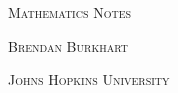 \documentclass[11pt]{report}
\begin{document}
\begin{titlepage}
    \centering
    \vspace*{2cm}
	{\scshape\LARGE Mathematics Notes \par}
    \vspace{1cm}
    \vfill
    \vfill
    \vfill
    \vfill

    {\scshape\large Brendan Burkhart \par}
    \vspace{0.5cm}
    {\scshape Johns Hopkins University \par}

    \vfill
\end{titlepage}

\tableofcontents
\newpage









\end{document}
